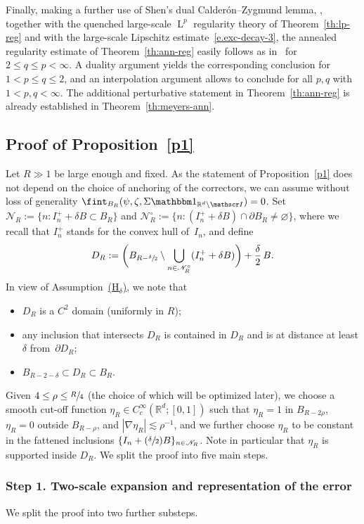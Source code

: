 \documentclass[10pt]{amsart}
\let\mathcal\mathscr
\newcommand{\Hd}{\hyperref[Hd]{\textup{(H$_\delta$)}}\xspace}
\newcommand{\Psfrac}[2]{(\sfrac{#1}{#2})}
\let\mathds\mathbbm
\theoremstyle{plain}
\theoremstyle{definition}
\newcommand{\R}{\mathbb R}
\newcommand{\Ic}{\mathcal I}
\newcommand{\Nc}{\mathcal N}
\newcommand{\Ld}{\operatorname{L}}
\newcommand{\step}[1]{\subsubsection*{Step #1}}
\begin{document}
Finally, making a further use of Shen's dual Calderón--Zygmund lemma, \cf \cite[Th.\,3.2 or~3.4]{Shen-07}, together with the quenched large-scale $\Ld^p$ regularity theory of Theorem~\ref{th:lp-reg} and with the large-scale Lipschitz estimate~\eqref{e.exc-decay-3}, the annealed regularity estimate of Theorem~\ref{th:ann-reg} easily follows as in~\cite{DO1} for $2\le q\le p<\infty$.
A duality argument yields the corresponding conclusion for $1<p\le q\le2$, and an interpolation argument allows to conclude for all $p,q$ with $1<p,q<\infty$. The additional perturbative statement in Theorem~\ref{th:ann-reg} is already established in Theorem~\ref{th:meyers-ann}.

\subsection{Proof of Proposition~\ref{p1}}\label{sec:pr-p1}
Let $R\gg1$ be large enough and fixed. As the statement of Proposition~\ref{p1} does not depend on the choice of anchoring of the correctors, we can assume without loss of generality $\fint_{B_R} (\psi,\zeta,\Sigma\mathds1_{\R^d\setminus\Ic})=0$.
Set $\Nc_R:=\{n:I_n^++\delta B\subset B_{R}\}$ and $\Nc_R^\circ:=\{n:(I_n^++\delta B)\cap \partial B_{R}\ne\varnothing\}$, where we recall that $I_n^+$ stands for the convex hull of~$I_n$, and define
\[D_R:=\bigg(B_{R-\sfrac\delta2}\setminus\bigcup_{n\in\Nc_R^\circ}(I_n^++\delta B)\bigg)+\frac\delta2\,B.\]
In view of Assumption~\Hd, we note that
\begin{itemize}
\item $D_R$ is a $C^2$ domain (uniformly in $R$);
\item any inclusion that intersects $D_R$ is contained in $D_R$ and is at distance at least $\delta$ from~$\partial D_R$;
\item $B_{R-2-\delta}\subset D_R\subset B_R$.
\end{itemize}
Given $4\le\rho\le\sfrac R4$ (the choice of which will be optimized later), we choose a smooth cut-off function $\eta_R\in C^\infty_c(\R^d;[0,1])$ such that $\eta_R=1$ in $B_{R-2\rho}$, $\eta_R=0$ outside $B_{R-\rho}$, and $|\nabla\eta_R|\lesssim\rho^{-1}$, and we further choose $\eta_R$ to be constant in the fattened inclusions $\{I_n+\Psfrac\delta2 B\}_{n\in\Nc_R}$.
Note in particular that $\eta_R$ is supported inside $D_R$.
We split the proof into five main steps.

\step{1. Two-scale expansion and representation of the error}
We split the proof into two further substeps.
\end{document}
